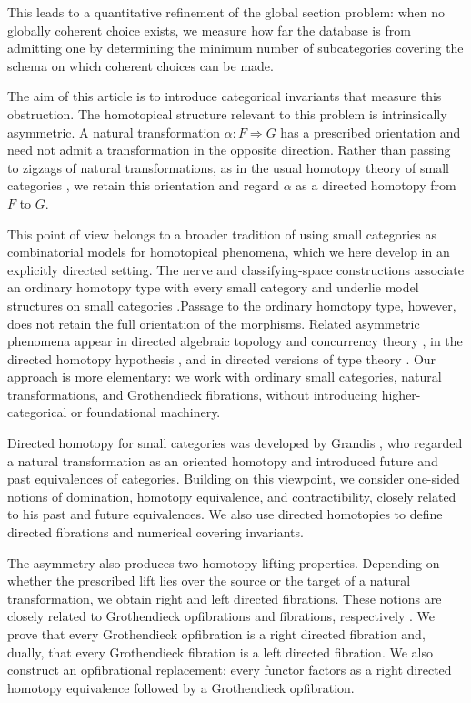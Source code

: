 \documentclass[12pt]{amsart}
\theoremstyle{definition}
\theoremstyle{remark}
\numberwithin{figure}{section}%
\begin{document}
This leads to a quantitative refinement of the global section problem: when no globally coherent choice exists, we measure how far the database is from admitting one by determining the minimum number of subcategories covering the schema on which coherent choices can be made.

The aim of this article is to introduce categorical invariants that measure
this obstruction. The homotopical structure relevant to this problem is
intrinsically asymmetric. A natural transformation
\(\alpha\colon F\Rightarrow G\) has a prescribed orientation and need not
admit a transformation in the opposite direction. Rather than passing to
zigzags of natural transformations, as in the usual homotopy theory of
small categories \cite{LEEHomotopy}, we retain this orientation and regard \(\alpha\) as a directed homotopy from \(F\) to \(G\).


This point of view belongs to a broader tradition of using small
categories as combinatorial models for homotopical phenomena, which we
here develop in an explicitly directed setting.
The nerve and classifying-space constructions associate an ordinary
homotopy type with every small category
\cite{QuillenKTheory,ClassifyingSpace} and underlie model structures on
small categories \cite{Thomason,Cat_Miniam}.Passage to the ordinary homotopy type, however, does not
retain the full orientation of the morphisms. Related asymmetric phenomena
appear in directed algebraic topology and concurrency theory
\cite{DirectedConcurrency,GrandisDirected}, in the directed homotopy
hypothesis \cite{DirectedHomotopyHypothesis}, and in directed versions of
type theory
\cite{DirectedHomotopyHypothesis,DirectedTypeTheorySynthetic}.
Our approach is more elementary: we work with ordinary small categories,
natural transformations, and Grothendieck fibrations, without introducing
higher-categorical or foundational machinery.

Directed homotopy for small categories was developed by Grandis
\cite{GrandisShape}, who regarded a natural transformation as an oriented
homotopy and introduced future and past equivalences of categories. Building on this viewpoint, we consider one-sided notions of domination,
homotopy equivalence, and contractibility, closely related to his past and
future equivalences. We also use directed homotopies to define directed
fibrations and numerical covering invariants.

The asymmetry also produces two homotopy lifting properties. Depending on
whether the prescribed lift lies over the source or the target of a natural
transformation, we obtain right and left directed fibrations. These notions
are closely related to Grothendieck opfibrations and fibrations,
respectively \cite{GrothendieckRevetements}. We prove that every
Grothendieck opfibration is a right directed fibration and, dually, that
every Grothendieck fibration is a left directed fibration. We also construct
an opfibrational replacement: every functor factors as a right directed
homotopy equivalence followed by a Grothendieck opfibration.
\end{document}
